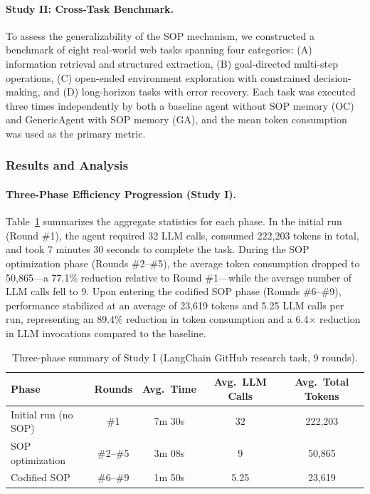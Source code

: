 \paragraph{Study II: Cross-Task Benchmark.}
To assess the generalizability of the SOP mechanism, we constructed a benchmark of eight real-world web tasks spanning four categories: (A) information retrieval and structured extraction, (B) goal-directed multi-step operations, (C) open-ended environment exploration with constrained decision-making, and (D) long-horizon tasks with error recovery. Each task was executed three times independently by both a baseline agent without SOP memory (OC) and GenericAgent with SOP memory (GA), and the mean token consumption was used as the primary metric.

\subsubsection{Results and Analysis}

\paragraph{Three-Phase Efficiency Progression (Study I).}

Table~\ref{tab:self_evo_three_phase} summarizes the aggregate statistics for each phase. In the initial run (Round \#1), the agent required 32 LLM calls, consumed 222,203 tokens in total, and took 7 minutes 30 seconds to complete the task. During the SOP optimization phase (Rounds \#2--\#5), the average token consumption dropped to 50,865—a 77.1\% reduction relative to Round \#1—while the average number of LLM calls fell to 9. Upon entering the codified SOP phase (Rounds \#6--\#9), performance stabilized at an average of 23,619 tokens and 5.25 LLM calls per run, representing an 89.4\% reduction in token consumption and a 6.4$\times$ reduction in LLM invocations compared to the baseline.

\begin{table}[h]
\centering
\caption{Three-phase summary of Study I (LangChain GitHub research task, 9 rounds).}
\label{tab:self_evo_three_phase}
\begin{tabular}{lcccc}
\toprule
Phase & Rounds & Avg.\ Time & Avg.\ LLM Calls & Avg.\ Total Tokens \\
\midrule
Initial run (no SOP)  & \#1       & 7m 30s & 32   & 222,203 \\
SOP optimization      & \#2--\#5  & 3m 08s & 9    & 50,865  \\
Codified SOP          & \#6--\#9  & 1m 50s & 5.25 & 23,619  \\
\bottomrule
\end{tabular}
\end{table}

